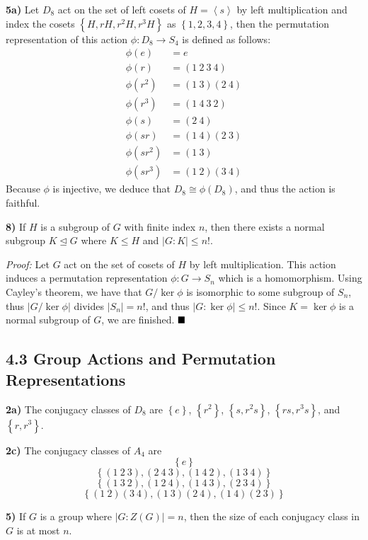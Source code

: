 \documentclass[12pt]{article}
\newcommand{\angleb}[1]{\left\langle#1\right\rangle}
\newcommand{\braceb}[1]{\left\{#1\right\}}
\newcommand{\vertb}[1]{\left\vert#1\right\vert}
\newcommand{\normsub}{\trianglelefteq}
\newcommand{\proof}{\textit{Proof: }}
\newcommand{\done}{\ensuremath{\strut\hfill\blacksquare}}
\begin{document}
\textbf{5a)}
Let \( D_8 \) act on the set of left cosets of \( H = \angleb{s} \) by left
multiplication and index the cosets \( \braceb{H, rH, r^2H, r^3H} \) as
\( \braceb{1, 2, 3, 4} \), then the permutation representation of this action
\( \phi : D_8 \to S_4 \) is defined as follows:
\begin{align*}
	\phi(e)    & = e            \\
	\phi(r)    & = (1\ 2\ 3\ 4) \\
	\phi(r^2)  & = (1\ 3)(2\ 4) \\
	\phi(r^3)  & = (1\ 4\ 3\ 2) \\
	\phi(s)    & = (2\ 4)       \\
	\phi(sr)   & = (1\ 4)(2\ 3) \\
	\phi(sr^2) & = (1\ 3)       \\
	\phi(sr^3) & = (1\ 2)(3\ 4)
\end{align*}
Because \( \phi \) is injective, we deduce that \( D_8 \cong \phi(D_8) \), and
thus the action is faithful.

\textbf{8)}
If \( H \) is a subgroup of \( G \) with finite index \( n \), then there
exists a normal subgroup \( K \normsub G \) where \( K \leq H \) and
\( \vertb{G : K} \leq n! \).

\proof
Let \( G \) act on the set of cosets of \( H \) by left multiplication.
This action induces a permutation representation \( \phi : G \to S_n \) which
is a homomorphism.
Using Cayley's theorem, we have that \( G/\ker\phi \) is isomorphic to some
subgroup of \( S_n \), thus \( \vertb{G/\ker\phi} \) divides
\( \vertb{S_n} = n! \), and thus \( \vertb{G : \ker\phi} \leq n! \).
Since \( K = \ker\phi \) is a normal subgroup of \( G \), we are finished.
\done

\subsection*{4.3 Group Actions and Permutation Representations}

\textbf{2a)} The conjugacy classes of \( D_8 \) are \( \braceb{e} \),
\( \braceb{r^2} \), \( \braceb{s, r^2s} \), \( \braceb{rs,r^3s} \), and
\( \braceb{r, r^3} \).

\textbf{2c)} The conjugacy classes of \( A_4 \) are
\[ \braceb{e} \]
\[ \braceb{(1\ 2\ 3), (2\ 4\ 3), (1\ 4\ 2), (1\ 3\ 4)} \]
\[ \braceb{(1\ 3\ 2), (1\ 2\ 4), (1\ 4\ 3), (2\ 3\ 4)} \]
\[ \braceb{(1\ 2)(3\ 4), (1\ 3)(2\ 4), (1\ 4)(2\ 3)} \]

\textbf{5)}
If \( G \) is a group where \( \vertb{G : Z(G)} = n \), then the size of each
conjugacy class in \( G \) is at most \( n \).
\end{document}
